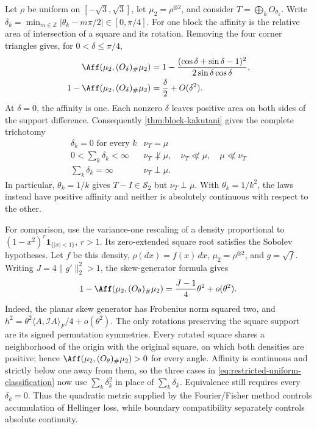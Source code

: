 Let \(\rho\) be uniform on \([-\sqrt3,\sqrt3]\), let
\(\mu_2=\rho^{\otimes2}\), and consider \(T=\bigoplus_kO_{\theta_k}\).
Write
\(\delta_k=\min_{m\in\mathbb Z}|\theta_k-m\pi/2|\in[0,\pi/4]\).
For one block the affinity is the relative area of intersection
of a square and its rotation.
Removing the four corner triangles gives, for \(0<\delta\leq\pi/4\),
\begin{equation}
 \begin{aligned}
 \Aff(\mu_2,(O_\delta)_\#\mu_2)
 &=1-\frac{(\cos\delta+\sin\delta-1)^2}
                {2\sin\delta\cos\delta},\\
 1-\Aff(\mu_2,(O_\delta)_\#\mu_2)
 &=\frac{\delta}{2}+O(\delta^2).
 \end{aligned}
 \label{eq:restricted-uniform-rotation}
\end{equation}
At \(\delta=0\), the affinity is one.  Each nonzero \(\delta\) leaves
positive area on both sides of the support difference.
Consequently \cref{thm:block-kakutani} gives the complete trichotomy
\begin{equation}
 \begin{array}{c|l}
  \delta_k=0\text{ for every }k&\nu_T=\mu\\
  0<\sum_k\delta_k<\infty&
      \nu_T\not\perp\mu,\quad \nu_T\not\ll\mu,\quad\mu\not\ll\nu_T\\
  \sum_k\delta_k=\infty&\nu_T\perp\mu.
 \end{array}
 \label{eq:restricted-uniform-classification}
\end{equation}
In particular, \(\theta_k=1/k\) gives \(T-I\in\mathcal S_2\) but
\(\nu_T\perp\mu\).
With \(\theta_k=1/k^2\), the laws instead have positive affinity
and neither is absolutely continuous with respect to the other.

For comparison, use the variance-one rescaling of a density proportional
to \((1-x^2)^r\mathbf1_{\{|x|<1\}}\), \(r>1\).
Its zero-extended square root satisfies the Sobolev hypotheses.
Let \(f\) be this density, \(\rho(dx)=f(x)\,dx\),
\(\mu_2=\rho^{\otimes2}\), and \(g=\sqrt f\).
Writing \(J=4\|g'\|_2^2>1\), the skew-generator formula gives
\begin{equation}
 1-\Aff(\mu_2,(O_\theta)_\#\mu_2)=\frac{J-1}{4}\theta^2+o(\theta^2).
 \label{eq:restricted-smooth-rotation}
\end{equation}
Indeed, the planar skew generator has Frobenius norm squared two,
and \(h^2=\theta^2\langle A,\mathcal I A\rangle_F/4+o(\theta^2)\).
The only rotations preserving the square support are its signed
permutation symmetries.
Every rotated square shares a neighborhood of the origin with the
original square, on which both densities are positive; hence
\(\Aff(\mu_2,(O_\theta)_\#\mu_2)>0\) for every angle.
Affinity is continuous and strictly below one away from them,
so the three cases in \eqref{eq:restricted-uniform-classification}
now use \(\sum_k\delta_k^2\) in place of \(\sum_k\delta_k\).
Equivalence still requires every \(\delta_k=0\).
Thus the quadratic metric supplied by the Fourier/Fisher method controls
accumulation of Hellinger loss, while boundary compatibility separately
controls absolute continuity.

